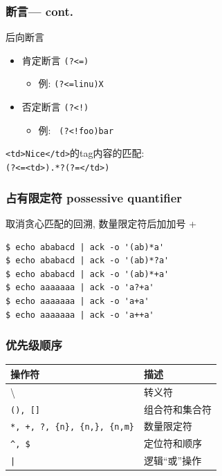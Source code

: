 \documentclass[compress]{beamer}
\begin{document}
\begin{frame}[fragile]
    \frametitle{断言--- cont.}
\begin{block}{后向断言}
    \begin{itemize}
        \item 肯定断言 \verb~(?<=)~
            \begin{itemize}
                \item 例: \verb~(?<=linu)X~
    \end{itemize}
        \item 否定断言 \verb~(?<!)~
            \begin{itemize}
                \item 例: \verb~ (?<!foo)bar~ 
            \end{itemize}
    \end{itemize}
\end{block}
\verb~<td>Nice</td>~的tag内容的匹配: \\
\verb~(?<=<td>).*?(?=</td>)~
\end{frame}

\begin{frame}[fragile]
\frametitle{占有限定符 possessive quantifier}
\noindent 取消贪心匹配的回溯, 数量限定符后加加号 +

\begin{Verbatim}
$ echo ababacd | ack -o '(ab)*a'
$ echo ababacd | ack -o '(ab)*?a'
$ echo ababacd | ack -o '(ab)*+a'
$ echo aaaaaaa | ack -o 'a?+a'
$ echo aaaaaaa | ack -o 'a+a'
$ echo aaaaaaa | ack -o 'a++a'
\end{Verbatim}

\end{frame}


\begin{frame}[fragile]
\frametitle{优先级顺序}

\begin{tabular}{|l|p{4cm}|} \hline

操作符 & 描述 \\ \hline\hline

\textbackslash & 转义符 \\ \hline

\verb=(), []= & 组合符和集合符 \\ \hline

\verb=*, +, ?, {n}, {n,}, {n,m}= & 数量限定符 \\ \hline

\verb=^, $= & 定位符和顺序 \\ \hline

\verb=|= & 逻辑``或''操作 \\ \hline

\end{tabular}
\end{frame}
\end{document}
